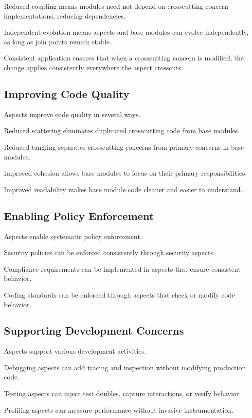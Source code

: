 \documentclass[11pt]{article}
\begin{document}
Reduced coupling means modules need not depend on crosscutting concern implementations, reducing dependencies.

Independent evolution means aspects and base modules can evolve independently, as long as join points remain stable.

Consistent application ensures that when a crosscutting concern is modified, the change applies consistently everywhere the aspect crosscuts.

\subsection{Improving Code Quality}

Aspects improve code quality in several ways.

Reduced scattering eliminates duplicated crosscutting code from base modules.

Reduced tangling separates crosscutting concerns from primary concerns in base modules.

Improved cohesion allows base modules to focus on their primary responsibilities.

Improved readability makes base module code cleaner and easier to understand.

\subsection{Enabling Policy Enforcement}

Aspects enable systematic policy enforcement.

Security policies can be enforced consistently through security aspects.

Compliance requirements can be implemented in aspects that ensure consistent behavior.

Coding standards can be enforced through aspects that check or modify code behavior.

\subsection{Supporting Development Concerns}

Aspects support various development activities.

Debugging aspects can add tracing and inspection without modifying production code.

Testing aspects can inject test doubles, capture interactions, or verify behavior.

Profiling aspects can measure performance without invasive instrumentation.
\end{document}
